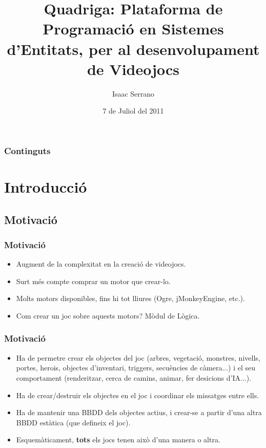 \documentclass[serif,9pt]{beamer}
\begin{document}
\title[Quadriga]{Quadriga: Plataforma de Programació en Sistemes d'Entitats, per al desenvolupament de Videojocs}  
\author{Isaac Serrano}
\date{7 de Juliol del 2011}

\begin{frame}
\titlepage
\end{frame}

\begin{frame}
\frametitle{Continguts}
\tableofcontents
\end{frame}

\section{Introducció}

  \subsection{Motivació}

    \begin{frame}\frametitle{Motivació}
     \begin{itemize}
      \item Augment de la complexitat en la creació de videojocs. \pause
      \item Surt més compte comprar un motor que crear-lo. \pause
      \item Molts motors disponibles, fins hi tot lliures (Ogre, jMonkeyEngine, etc.).\pause
      \item Com crear un joc sobre aquests motors? Mòdul de Lògica.
     \end{itemize}
    \end{frame}

    \begin{frame}\frametitle{Motivació}
      \begin{itemize}
        \item Ha de permetre crear els objectes del joc (arbres, vegetació, monstres, nivells, portes, herois, objectes d'inventari, triggers, secuències de càmera...) i el seu comportament (renderitzar, cerca de camins, animar, fer desicions d'IA...).\pause
        \item Ha de crear/destruir els objectes en el joc i coordinar els missatges entre ells.\pause
        \item Ha de mantenir una BBDD dels objectes actius, i crear-se a partir d'una altra BBDD estàtica (que defineix el joc).\pause
        \item Esquemàticament, {\bf tots} els jocs tenen això d'una manera o altra.
      \end{itemize}
    \end{frame}
\end{document}
